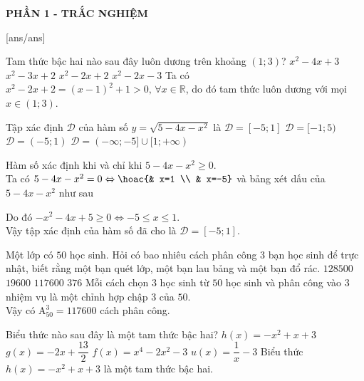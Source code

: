 
\begin{center}
	\textbf{PHẦN 1 - TRẮC NGHIỆM}
\end{center}
[ans/ans]
\begin{ex}%
	Tam thức bậc hai nào sau đây luôn dương trên khoảng $(1;3)$?
	\choice
	{$x^2-4x+3$}
	{$x^2-3x+2$}
	{\True $x^2-2x+2$}
	{$x^2-2x-3$}
	\loigiai
	{Ta có $x^2-2x+2=(x-1)^2+1>0,\, \forall x\in \mathbb{R}$, do đó tam thức luôn dương với mọi $x\in (1;3)$.}
\end{ex}

\begin{ex}%
	Tập xác định $\mathscr{D}$ của hàm số $y=\sqrt{5-4x-x^2}$ là
	\choice
	{\True $\mathscr{D}=[-5;1]$}
	{$\mathscr{D}=[-1;5)$}
	{$\mathscr{D}=(-5;1)$}
	{$\mathscr{D}=(-\infty;-5]\cup [1;+\infty)$}
	\loigiai
	{Hàm số xác định khi và chỉ khi $5-4x-x^2\geq 0$.\\
		Ta có $5-4x-x^2=0\Leftrightarrow \hoac{& x=1 \\ & x=-5}$ và bảng xét dấu của $5-4x-x^2$ như sau
		\begin{center}
		\end{center}
		Do đó $-x^2-4x+5\geq 0 \Leftrightarrow -5\leq x\leq 1$.\\
		Vậy tập xác định của hàm số đã cho là $\mathscr{D}=[-5;1]$.}
\end{ex}

\begin{ex}%
	Một lớp có $50$ học sinh. Hỏi có bao nhiêu cách phân công $3$ bạn học sinh để trực nhật, biết rằng một bạn quét lớp, một bạn lau bảng và một bạn đổ rác.
	\choice
	{$128500$}
	{$19600$}
	{\True $117600$}
	{$376$}
	\loigiai
	{Mỗi cách chọn $3$ học sinh từ $50$ học sinh và phân công vào $3$ nhiệm vụ là một chỉnh hợp chập $3$ của $50$.\\
		Vậy có $\mathrm{A}_{50}^3 = 117600$ cách phân công.}
\end{ex}
\begin{ex}%
	Biểu thức nào sau đây là một tam thức bậc hai?
	\choice
	{\True $h(x)=-x^2+x+3$}
	{$g(x)=-2x+\dfrac{13}{2}$}
	{$f(x)=x^4-2x^2-3$}
	{$u(x)=\dfrac{1}{x}-3$}
	\loigiai
	{Biểu thức $h(x)=-x^2+x+3$ là một tam thức bậc hai.}
\end{ex}


